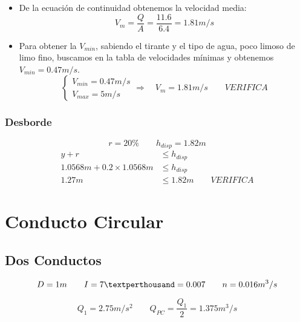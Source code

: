 \documentclass[10.5pt]{article}
\begin{document}
\begin{itemize}
 \item De la ecuación de continuidad obtenemos la velocidad media:
    \begin{equation*}
    V_{m} = \dfrac{Q}{A} = \dfrac{11.6}{6.4} = 1.81 m/s
    \end{equation*}
 \item Para obtener la $V_{min}$, sabiendo el tirante y el tipo de agua, poco limoso de limo fino, buscamos en
 la tabla de velocidades mínimas y obtenemos $V_{min} = 0.47 m/s$.
    \begin{equation*}
      \begin{cases}
      V_{min} = 0.47 m/s \\
      V_{max} = 5 m/s
      \end{cases}
      \Longrightarrow \quad
      V_{m} = 1.81 m/s
      \qquad
      VERIFICA
    \end{equation*}
\end{itemize}

\subsubsection*{Desborde}

\begin{equation*}
 r = 20\%
 \qquad
 h_{disp} = 1.82 m
\end{equation*}
\begin{align*}
 y + r &\leq h_{disp} \\
 1.0568 m + 0.2 \times 1.0568 m &\leq h_{disp} \\
 1.27 m &\leq 1.82 m
 \qquad
 VERIFICA
\end{align*}


\section*{Conducto Circular}

\subsection*{Dos Conductos}

\begin{equation*}
  D = 1 m
 \qquad
  I = 7 \textperthousand = 0.007
 \qquad
  n = 0.016 m^3/s
\end{equation*}

\begin{equation*}
  Q_{1} = 2.75 m/s^{2}
 \qquad
  Q_{PC} = \dfrac{Q_{1}}{2} = 1.375 m^{3}/s
\end{equation*}
\end{document}
